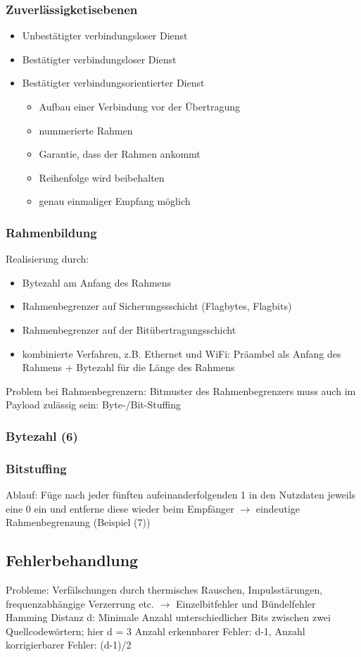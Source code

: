 \subsubsection{Zuverlässigketisebenen}
\begin{itemize}
	\item Unbestätigter verbindungsloser Dienst
	\item Bestätigter verbindungsloser Dienst
	\item Bestätigter verbindungsorientierter Dienst
	\begin{itemize}
		\item Aufbau einer Verbindung vor der Übertragung
		\item nummerierte Rahmen
		\item Garantie, dass der Rahmen ankommt
		\item Reihenfolge wird beibehalten
		\item genau einmaliger Empfang möglich
	\end{itemize}
\end{itemize}
\subsubsection{Rahmenbildung}
Realisierung durch:
\begin{itemize}
	\item Bytezahl am Anfang des Rahmens
	\item Rahmenbegrenzer auf Sicherungssschicht (Flagbytes, Flagbits)
	\item Rahmenbegrenzer auf der Bitübertragungsschicht
	\item kombinierte Verfahren, z.B. Ethernet und WiFi: Präambel als Anfang des Rahmens + Bytezahl für die Länge des Rahmens
\end{itemize}
Problem bei Rahmenbegrenzern: Bitmuster des Rahmenbegrenzers muss auch im Payload zulässig sein: Byte-/Bit-Stuffing
\subsubsection{Bytezahl (6)}
\subsubsection{Bitstuffing}
Ablauf: Füge nach jeder fünften aufeinanderfolgenden 1 in den Nutzdaten jeweils eine 0 ein und entferne diese wieder beim Empfänger \(\to\) eindeutige Rahmenbegrenzung (Beispiel (7))
\subsection{Fehlerbehandlung}
Probleme: Verfälschungen durch thermisches Rauschen, Impulsstärungen, frequenzabhängige Verzerrung etc. \(\to\) Einzelbitfehler und Bündelfehler\\
Hamming Distanz d: Minimale Anzahl unterschiedlicher Bits zwischen zwei Quellcodewörtern; hier d = 3 Anzahl erkennbarer Fehler: d-1, Anzahl korrigierbarer Fehler: (d-1)/2
